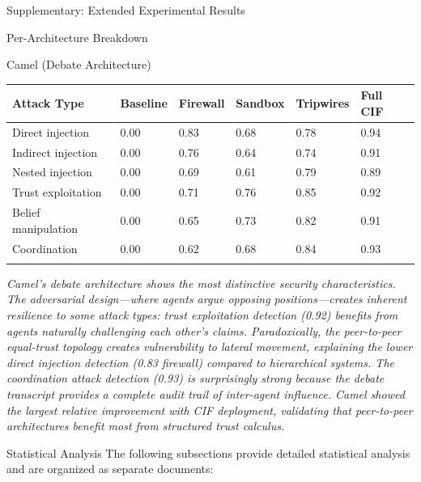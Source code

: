 \documentclass[
  ignorenonframetext,
]{beamer}
\newcounter{none} %
\begin{document}
\begin{frame}[fragile]{Supplementary: Extended Experimental Results}
\begin{block}{Per-Architecture Breakdown}
\begin{block}{Camel (Debate Architecture)}
{\def\LTcaptype{none} %
\begin{longtable}[]{@{}llllll@{}}
\toprule\noalign{}
Attack Type & Baseline & Firewall & Sandbox & Tripwires & Full CIF \\
\midrule\noalign{}
\endhead
Direct injection & 0.00 & 0.83 & 0.68 & 0.78 & 0.94 \\
Indirect injection & 0.00 & 0.76 & 0.64 & 0.74 & 0.91 \\
Nested injection & 0.00 & 0.69 & 0.61 & 0.79 & 0.89 \\
Trust exploitation & 0.00 & 0.71 & 0.76 & 0.85 & 0.92 \\
Belief manipulation & 0.00 & 0.65 & 0.73 & 0.82 & 0.91 \\
Coordination & 0.00 & 0.62 & 0.68 & 0.84 & 0.93 \\
\bottomrule\noalign{}
\end{longtable}
}

\emph{Camel's debate architecture shows the most distinctive security
characteristics. The adversarial design---where agents argue opposing
positions---creates inherent resilience to some attack types: trust
exploitation detection (0.92) benefits from agents naturally challenging
each other's claims. Paradoxically, the peer-to-peer equal-trust
topology creates vulnerability to lateral movement, explaining the lower
direct injection detection (0.83 firewall) compared to hierarchical
systems. The coordination attack detection (0.93) is surprisingly strong
because the debate transcript provides a complete audit trail of
inter-agent influence. Camel showed the largest relative improvement
with CIF deployment, validating that peer-to-peer architectures benefit
most from structured trust calculus.}
\end{block}
\end{block}

\begin{block}{Statistical Analysis}
\protect{}\label{statistical-analysis}
The following subsections provide detailed statistical analysis and are
organized as separate documents:


\end{block}
\end{frame}
\end{document}
